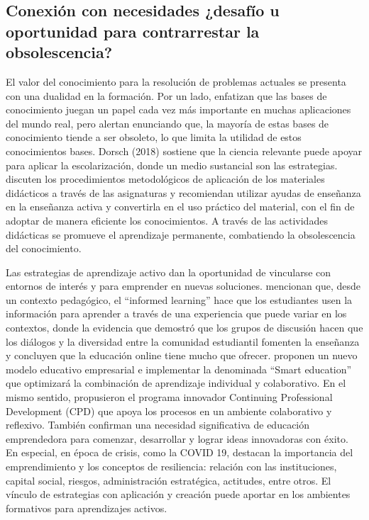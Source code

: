 \documentclass{textolivre}
\begin{document}
\subsection{Conexión con necesidades ¿desafío u oportunidad para contrarrestar la obsolescencia?}\label{sec-fmt-manuscrito}
El valor del conocimiento para la resolución de problemas actuales se presenta con una dualidad en la formación. Por un lado,  \textcite{liang_how_2017} enfatizan que las bases de conocimiento juegan un papel cada vez más importante en muchas aplicaciones del mundo real, pero alertan enunciando que, la mayoría de estas bases de conocimiento tiende a ser obsoleto, lo que limita la utilidad de estos conocimientos bases. Dorsch (2018) sostiene que la ciencia relevante puede apoyar para aplicar la escolarización, donde un medio sustancial son las estrategias. \textcite{visnic_evaluation_2017} discuten los procedimientos metodológicos de aplicación de los materiales didácticos a través de las asignaturas y recomiendan utilizar ayudas de enseñanza en la enseñanza activa y convertirla en el uso práctico del material, con el fin de adoptar de manera eficiente los conocimientos. A través de las actividades didácticas se promueve el aprendizaje permanente, combatiendo la obsolescencia del conocimiento.

Las estrategias de aprendizaje activo dan la oportunidad de vincularse con entornos de interés y para emprender en nuevas soluciones. \textcite{webster_distance_2017} mencionan que, desde un contexto pedagógico, el “informed learning” hace que los estudiantes usen la información  para aprender a través de una experiencia que puede variar en los contextos, donde la evidencia que demostró que los grupos de discusión hacen que los diálogos y la diversidad entre la comunidad estudiantil fomenten la enseñanza y concluyen que la educación online tiene mucho que ofrecer. \textcite{roslina_role_2017} proponen un nuevo modelo educativo empresarial e implementar la denominada “Smart education” que optimizará la combinación de aprendizaje individual y colaborativo. En el mismo sentido, \textcite{kartal_improving_2018} propusieron el programa innovador Continuing Professional Development (CPD) que apoya los procesos en un ambiente colaborativo y reflexivo. También \textcite{vaicekauskaite_need_2018} confirman una necesidad significativa de educación emprendedora para comenzar, desarrollar y lograr ideas innovadoras con éxito. En especial, en época de crisis, como la COVID 19, \textcite{portuguez_castro_being_2020} destacan la importancia del emprendimiento y los conceptos de resiliencia:  relación con las instituciones, capital social, riesgos, administración estratégica, actitudes, entre otros. El vínculo de estrategias con aplicación y creación puede aportar en los ambientes formativos para aprendizajes activos.
\end{document}
